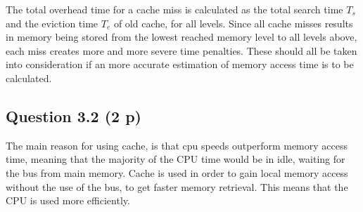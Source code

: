 \documentclass{article}
\begin{document}
The total overhead time for a cache miss is calculated as the total search time $T_s$ and the eviction time $T_e$ of old cache, for all levels. Since all cache misses results in memory being stored from the lowest reached memory level to all levels above, each miss creates more and more severe time penalties. These should all be taken into consideration if an more accurate estimation of memory access time is to be calculated.



\subsection{Question 3.2 (2 p)}
The main reason for using cache, is that cpu speeds outperform memory access time, meaning that the majority of the CPU time would be in idle, waiting for the bus from main memory. Cache is used in order to gain local memory access without the use of the bus, to get faster memory retrieval. This means that the CPU is used more efficiently. 




\end{document}
